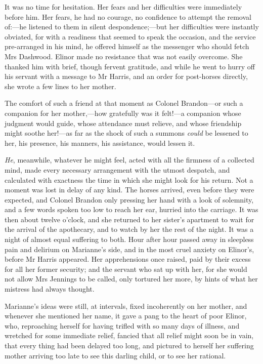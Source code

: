 It was no time for hesitation. Her fears and her difficulties were immediately before him. Her fears, he had no courage, no confidence to attempt the removal of:—he listened to them in silent despondence;—but her difficulties were instantly obviated, for with a readiness that seemed to speak the occasion, and the service pre-arranged in his mind, he offered himself as the messenger who should fetch Mrs Dashwood. Elinor made no resistance that was not easily overcome. She thanked him with brief, though fervent gratitude, and while he went to hurry off his servant with a message to Mr Harris, and an order for post-horses directly, she wrote a few lines to her mother.

The comfort of such a friend at that moment as Colonel Brandon—or such a companion for her mother,—how gratefully was it felt!—a companion whose judgment would guide, whose attendance must relieve, and whose friendship might soothe her!—as far as the shock of such a summons \textit{could} be lessened to her, his presence, his manners, his assistance, would lessen it.

\textit{He}, meanwhile, whatever he might feel, acted with all the firmness of a collected mind, made every necessary arrangement with the utmost despatch, and calculated with exactness the time in which she might look for his return. Not a moment was lost in delay of any kind. The horses arrived, even before they were expected, and Colonel Brandon only pressing her hand with a look of solemnity, and a few words spoken too low to reach her ear, hurried into the carriage. It was then about twelve o’clock, and she returned to her sister’s apartment to wait for the arrival of the apothecary, and to watch by her the rest of the night. It was a night of almost equal suffering to both. Hour after hour passed away in sleepless pain and delirium on Marianne’s side, and in the most cruel anxiety on Elinor’s, before Mr Harris appeared. Her apprehensions once raised, paid by their excess for all her former security; and the servant who sat up with her, for she would not allow Mrs Jennings to be called, only tortured her more, by hints of what her mistress had always thought.

Marianne’s ideas were still, at intervals, fixed incoherently on her mother, and whenever she mentioned her name, it gave a pang to the heart of poor Elinor, who, reproaching herself for having trifled with so many days of illness, and wretched for some immediate relief, fancied that all relief might soon be in vain, that every thing had been delayed too long, and pictured to herself her suffering mother arriving too late to see this darling child, or to see her rational.

